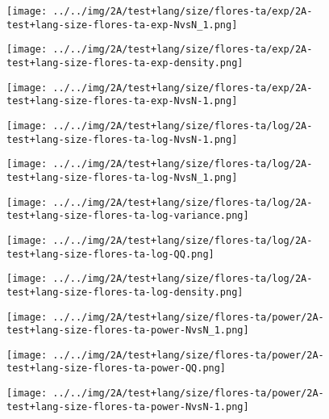 \begin{figure}[H]
\centering	\texttt{[image: ../../img/2A/test+lang/size/flores-ta/exp/2A-test+lang-size-flores-ta-exp-NvsN\_1.png]}
\end{figure}
\begin{figure}[H]
\centering	\texttt{[image: ../../img/2A/test+lang/size/flores-ta/exp/2A-test+lang-size-flores-ta-exp-density.png]}
\end{figure}
\begin{figure}[H]
\centering	\texttt{[image: ../../img/2A/test+lang/size/flores-ta/exp/2A-test+lang-size-flores-ta-exp-NvsN-1.png]}
\end{figure}
\begin{figure}[H]
\centering	\texttt{[image: ../../img/2A/test+lang/size/flores-ta/log/2A-test+lang-size-flores-ta-log-NvsN-1.png]}
\end{figure}
\begin{figure}[H]
\centering	\texttt{[image: ../../img/2A/test+lang/size/flores-ta/log/2A-test+lang-size-flores-ta-log-NvsN\_1.png]}
\end{figure}
\begin{figure}[H]
\centering	\texttt{[image: ../../img/2A/test+lang/size/flores-ta/log/2A-test+lang-size-flores-ta-log-variance.png]}
\end{figure}
\begin{figure}[H]
\centering	\texttt{[image: ../../img/2A/test+lang/size/flores-ta/log/2A-test+lang-size-flores-ta-log-QQ.png]}
\end{figure}
\begin{figure}[H]
\centering	\texttt{[image: ../../img/2A/test+lang/size/flores-ta/log/2A-test+lang-size-flores-ta-log-density.png]}
\end{figure}
\begin{figure}[H]
\centering	\texttt{[image: ../../img/2A/test+lang/size/flores-ta/power/2A-test+lang-size-flores-ta-power-NvsN\_1.png]}
\end{figure}
\begin{figure}[H]
\centering	\texttt{[image: ../../img/2A/test+lang/size/flores-ta/power/2A-test+lang-size-flores-ta-power-QQ.png]}
\end{figure}
\begin{figure}[H]
\centering	\texttt{[image: ../../img/2A/test+lang/size/flores-ta/power/2A-test+lang-size-flores-ta-power-NvsN-1.png]}
\end{figure}
